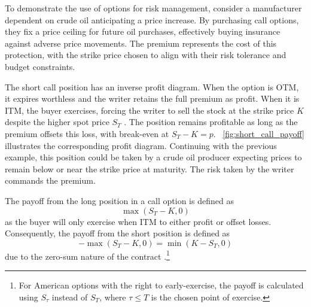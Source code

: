 \documentclass[english,12pt,a4paper,pdftex,sci,utf8]{aaltothesis}
\begin{document}
To demonstrate the use of options for risk management, consider a manufacturer dependent on crude oil anticipating a price increase. By purchasing call options, they fix a price ceiling for future oil purchases, effectively buying insurance against adverse price movements. The premium represents the cost of this protection, with the strike price chosen to align with their risk tolerance and budget constraints.

The short call position has an inverse profit diagram. When the option is OTM, it expires worthless and the writer retains the full premium as profit. When it is ITM, the buyer exercises, forcing the writer to sell the stock at the strike price $K$ despite the higher spot price $S_T$ \cite{hull2018}. The position remains profitable as long as the premium offsets this loss, with break-even at $S_T - K = p$. ~\cref{fig:short_call_payoff} illustrates the corresponding profit diagram. Continuing with the previous example, this position could be taken by a crude oil producer expecting prices to remain below or near the strike price at maturity. The risk taken by the writer commands the premium.

The payoff from the long position in a call option is defined as
\begin{equation}
    \max(S_T-K,0)
\label{eq:long_call_payoff}
\end{equation}
as the buyer will only exercise when ITM to either profit or offset losses. Consequently, the payoff from the short position is defined as 
\begin{equation*}
    -\max(S_T-K,0) = \min(K-S_T,0)
\end{equation*}
due to the zero-sum nature of the contract \cite{hull2018}.\footnote{For American options with the right to early-exercise, the payoff is calculated using $S_\tau$ instead of $S_T$, where $\tau \le T$ is the chosen point of exercise.}
\end{document}
